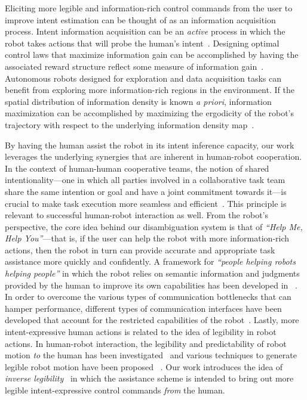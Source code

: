 \documentclass[natbib, twocolumn]{svjour3}          %
\begin{document}
Eliciting more legible and information-rich control commands from the user to improve intent estimation can be thought of as an information acquisition process. Intent information acquisition can be an \textit{active} process in which the robot takes actions that will probe the human's intent~\citep{sadigh2016information, sadigh2016planning}. Designing optimal control laws that maximize information gain can be accomplished by having the associated reward structure reflect some measure of information gain~\citep{atanasov2014information}. 
Autonomous robots designed for exploration and data acquisition tasks can benefit from exploring more information-rich regions in the environment. If the spatial distribution of information density is known \textit{a priori}, information maximization can be accomplished by maximizing the ergodicity of the robot's trajectory with respect to the underlying information density map~\citep{miller2016ergodic, miller2013trajectory}. 

By having the human assist the robot in its intent inference capacity, our work leverages the underlying synergies that are inherent in human-robot cooperation. In the context of human-human cooperative teams, the notion of shared intentionality---one in which all parties involved in a collaborative task team share the same intention or goal and have a joint commitment towards it---is crucial to make task execution more seamless and efficient~\citep{tomasello2007shared, tomasello2010gap}. This principle is relevant to successful human-robot interaction as well. From the robot's perspective, the core idea behind our disambiguation system is that of \textit{``Help Me, Help You''}---that is, if the user can help the robot with more information-rich actions, then the robot in turn can provide accurate and appropriate task assistance more quickly and confidently. A framework for \textit{``people helping robots helping people''} in which the robot relies on semantic information and judgments provided by the human to improve its own capabilities has been developed in ~\citep{sorokin2010people}. In order to overcome the various types of communication bottlenecks that can hamper performance, different types of communication interfaces have been developed that account for the restricted capabilities of the robot~\citep{goodfellow2010help}. Lastly, more intent-expressive human actions is related to the idea of legibility in robot actions. In human-robot interaction, the legibility and predictability of robot motion \textit{to} the human has been investigated~\citep{dragan2013legibility} and various techniques to generate legible robot motion have been proposed ~\citep{holladay2014legible}. Our work introduces the idea of \textit{inverse legibility}~\citep{gopinath2017mode} in which the assistance scheme is intended to bring out more legible intent-expressive control commands \textit{from} the human. 
\end{document}
